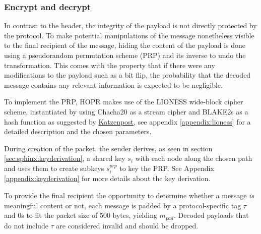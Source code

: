 \subsubsection{Encrypt and decrypt}

In contrast to the header, the integrity of the payload is not directly protected by the protocol. To make potential manipulations of the message nonetheless visible to the final recipient of the message, hiding the content of the payload is done using a pseudorandom permutation scheme (PRP) and its inverse to undo the transformation. This comes with the property that if there were any modifications to the payload such as a bit flip, the probability that the decoded message contains any relevant information is expected to be negligible.

To implement the PRP, HOPR makes use of the LIONESS \cite{lionesspaper} wide-block cipher scheme, instantiated by using Chacha20 as a stream cipher and BLAKE2s as a hash function as suggested by \href{https://katzenpost.mixnetworks.org/docs/specs/lioness.html}{Katzenpost}, see appendix \ref{appendix:lioness} for a detailed description and the chosen parameters.

During creation of the packet, the sender derives, as seen in section \ref{sec:sphinx:keyderivation}, a shared key $s_i$ with each node along the chosen path and uses them to create subkeys $s_i^{prp}$ to key the PRP. See Appendix \ref{appendix:keyderivation} for more details about the key derivation.

To provide the final recipient the opportunity to determine whether a message \textit{is} meaningful content or not, each message is padded by a protocol-specific tag $\tau$ and 0s to fit the packet size of 500 bytes, yielding $m_{pad}$. Decoded payloads that do not include $\tau$ are considered invalid and should be dropped.

